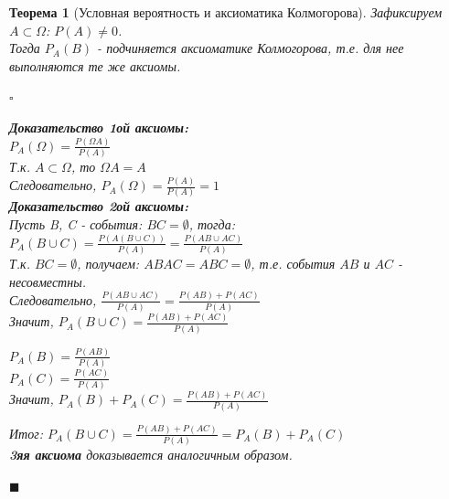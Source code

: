 \documentclass[14pt]{extarticle}
\theoremstyle{breakstyle}
\newtheorem{theorem}{Теорема}[subsection]
\begin{document}
\begin{theorem}[Условная вероятность и аксиоматика Колмогорова]

Зафиксируем $A \subset \Omega$: $P(A) \neq 0$. \\
Тогда $P_{A}(B)$ - подчиняется аксиоматике Колмогорова, т.е. для нее выполняются те же аксиомы.

$\square$

\textbf{Доказательство 1ой аксиомы:} \\
$P_{A}(\Omega) = \frac{P(\Omega A)}{P(A)}$ \\
Т.к. $A \subset \Omega$, то $\Omega A = A$ \\
Следовательно, $P_{A}(\Omega) = \frac{P(A)}{P(A)} = 1$ \\

\textbf{Доказательство 2ой аксиомы:} \\
Пусть B, C - события: $BC = \emptyset$, тогда: \\
$P_{A}(B \cup C) = \frac{P(A(B \cup C))}{P(A)} = \frac{P(AB \cup AC)}{P(A)}$ \\
Т.к. $BC = \emptyset$, получаем: $ABAC = ABC = \emptyset$, т.е. события $AB$ и $AC$ - несовместны. \\
Следовательно, $\frac{P(AB \cup AC)}{P(A)} = \frac{P(AB) + P(AC)}{P(A)}$ \\
Значит, $P_{A}(B \cup C) = \frac{P(AB) + P(AC)}{P(A)}$ \\

\vspace{\baselineskip}

$P_{A}(B) = \frac{P(AB)}{P(A)}$ \\
$P_{A}(C) = \frac{P(AC)}{P(A)}$ \\
Значит, $P_{A}(B) + P_{A}(C) = \frac{P(AB) + P(AC)}{P(A)}$ \\

\vspace{\baselineskip}

Итог: $P_{A}(B \cup C) = \frac{P(AB) + P(AC)}{P(A)} = P_{A}(B) + P_{A}(C)$ \\

\textbf{3яя аксиома} доказывается аналогичным образом.

\hfill$\blacksquare$

\end{theorem}
\end{document}
